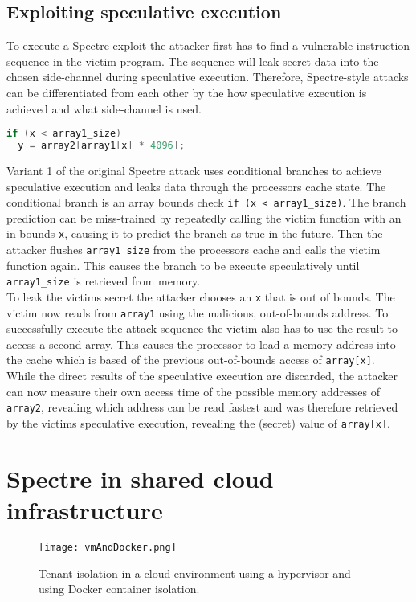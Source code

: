 \documentclass[conference,compsoc,final,a4paper]{IEEEtran}
\begin{document}
\subsection{Exploiting speculative execution}
To execute a Spectre exploit the attacker first has to find a vulnerable instruction sequence in the victim program. The sequence will leak secret data into the chosen
side-channel during speculative execution. Therefore, Spectre-style attacks can be differentiated from each other by the how speculative execution is achieved
and what side-channel is used. \cite{kocher2018spectre} \\
\begin{lstlisting}[language=C, caption=Spectre Variant 1 example \cite{kocher2018spectre}]
if (x < array1_size)
  y = array2[array1[x] * 4096];
\end{lstlisting}
Variant 1 of the original Spectre attack uses conditional branches to achieve speculative execution and leaks data through the processors cache state. The conditional branch is an array bounds check \lstinline|if (x < array1_size)|. The branch prediction can be miss-trained by repeatedly calling the victim function with an in-bounds \lstinline|x|, causing it to predict the branch as true in the future. Then the attacker flushes \lstinline|array1_size| from the processors cache and calls the victim function again. This causes the branch to be execute speculatively until \lstinline|array1_size| is retrieved from memory. \\
To leak the victims secret the attacker chooses an \lstinline|x| that is out of bounds. The victim now reads from \lstinline|array1| using the malicious, out-of-bounds address. To successfully execute the attack sequence the victim also has to use the result to access a second array. This causes the processor to load a memory address into the cache which is based of the previous out-of-bounds access of \lstinline|array[x]|. \\
While the direct results of the speculative execution are discarded, the attacker can now measure their own access time of the possible memory addresses of \lstinline|array2|, revealing which address can be read fastest and was therefore retrieved by the victims speculative execution, revealing the (secret) value of \lstinline|array[x]|.
\section{Spectre in shared cloud infrastructure}
\begin{figure}[!ht]
\centering
\texttt{[image: vmAndDocker.png]}
\caption{Tenant isolation in a cloud environment using a hypervisor and using Docker container isolation.}
\label{virtmem}
\end{figure}
\end{document}
